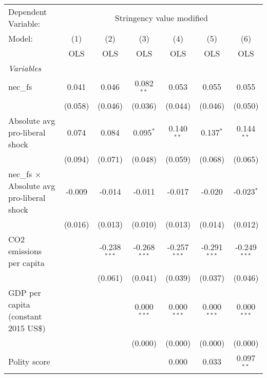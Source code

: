 
\begingroup
\centering
\begin{tabular}{lcccccc}
   \toprule
   Dependent Variable: & \multicolumn{6}{c}{Stringency value modified}\\
   Model:                                            & (1)     & (2)            & (3)            & (4)            & (5)            & (6)\\  
                                                     &  OLS    & OLS            & OLS            & OLS            & OLS            & OLS\\  
   \midrule
   \emph{Variables}\\
   nec\_fs                                           & 0.041   & 0.046          & 0.082$^{**}$   & 0.053          & 0.055          & 0.055\\   
                                                     & (0.058) & (0.046)        & (0.036)        & (0.044)        & (0.046)        & (0.050)\\   
   Absolute avg pro-liberal shock                    & 0.074   & 0.084          & 0.095$^{*}$    & 0.140$^{**}$   & 0.137$^{*}$    & 0.144$^{**}$\\   
                                                     & (0.094) & (0.071)        & (0.048)        & (0.059)        & (0.068)        & (0.065)\\   
   nec\_fs $\times$ Absolute avg pro-liberal shock   & -0.009  & -0.014         & -0.011         & -0.017         & -0.020         & -0.023$^{*}$\\   
                                                     & (0.016) & (0.013)        & (0.010)        & (0.013)        & (0.014)        & (0.012)\\   
   CO2 emissions per capita                          &         & -0.238$^{***}$ & -0.268$^{***}$ & -0.257$^{***}$ & -0.291$^{***}$ & -0.249$^{***}$\\   
                                                     &         & (0.061)        & (0.041)        & (0.039)        & (0.037)        & (0.046)\\   
   GDP per capita (constant 2015 US\$)               &         &                & 0.000$^{***}$  & 0.000$^{***}$  & 0.000$^{***}$  & 0.000$^{***}$\\   
                                                     &         &                & (0.000)        & (0.000)        & (0.000)        & (0.000)\\   
   Polity score                                      &         &                &                & 0.000          & 0.033          & 0.097$^{**}$\\   

\end{tabular}
